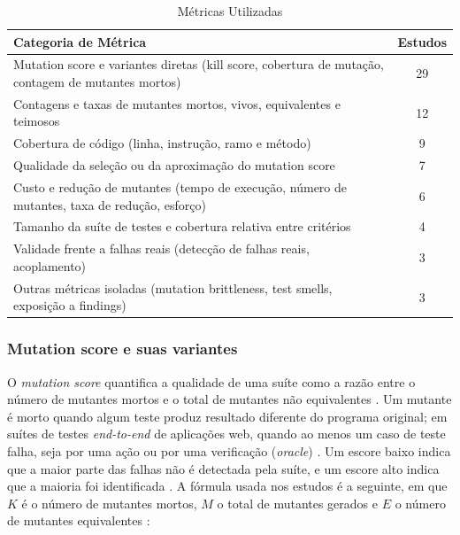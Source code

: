 \begin{table}[htb]
    \centering
    \caption{Métricas Utilizadas}
    \label{tab:metricas-utilizadas}
    \begin{tabularx}{0.95\textwidth}{X|c}
        \hline
        \textbf{Categoria de Métrica} & \textbf{Estudos} \\ \hline
        Mutation score e variantes diretas (kill score, cobertura de mutação, contagem de mutantes mortos) & 29 \\ \hline
        Contagens e taxas de mutantes mortos, vivos, equivalentes e teimosos & 12 \\ \hline
        Cobertura de código (linha, instrução, ramo e método) & 9 \\ \hline
        Qualidade da seleção ou da aproximação do mutation score & 7 \\ \hline
        Custo e redução de mutantes (tempo de execução, número de mutantes, taxa de redução, esforço) & 6 \\ \hline
        Tamanho da suíte de testes e cobertura relativa entre critérios & 4 \\ \hline
        Validade frente a falhas reais (detecção de falhas reais, acoplamento) & 3 \\ \hline
        Outras métricas isoladas (mutation brittleness, test smells, exposição a findings) & 3 \\ \hline
    \end{tabularx}
\end{table}


\subsubsection{Mutation score e suas variantes}
\label{subsec:mutation-score-variantes}

O \textit{mutation score} quantifica a qualidade de uma suíte como a razão entre o número de mutantes mortos e o total de mutantes não equivalentes \cite{chauhan2015, guerino2024}. Um mutante é morto quando algum teste produz resultado diferente do programa original; em suítes de testes \textit{end-to-end} de aplicações web, quando ao menos um caso de teste falha, seja por uma ação ou por uma verificação (\textit{oracle}) \cite{yandrapally2021}. Um escore baixo indica que a maior parte das falhas não é detectada pela suíte, e um escore alto indica que a maioria foi identificada \cite{chauhan2015}. A fórmula usada nos estudos é a seguinte, em que $K$ é o número de mutantes mortos, $M$ o total de mutantes gerados e $E$ o número de mutantes equivalentes \cite{assylbekov2013, ashong2025}:

